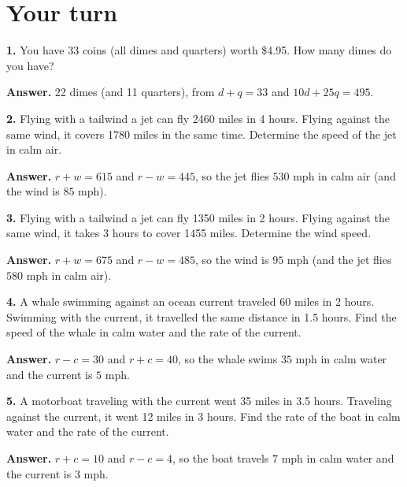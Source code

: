 \documentclass{ximera}
\begin{document}
\section*{Your turn}

\begin{problem}

\textbf{1.} You have 33 coins (all dimes and quarters) worth \$4.95. How many dimes do
you have?

\begin{hint}
\textbf{Answer.} 22 dimes (and 11 quarters), from $d+q=33$ and $10d+25q=495$.
\end{hint}
\end{problem}

\begin{problem}

\textbf{2.} Flying with a tailwind a jet can fly 2460 miles in 4 hours. Flying against
the same wind, it covers 1780 miles in the same time. Determine the speed of the jet in
calm air.

\begin{hint}
\textbf{Answer.} $r+w=615$ and $r-w=445$, so the jet flies $530$ mph in calm air (and the
wind is $85$ mph).
\end{hint}
\end{problem}

\begin{problem}

\textbf{3.} Flying with a tailwind a jet can fly 1350 miles in 2 hours. Flying against
the same wind, it takes 3 hours to cover 1455 miles. Determine the wind speed.

\begin{hint}
\textbf{Answer.} $r+w=675$ and $r-w=485$, so the wind is $95$ mph (and the jet flies
$580$ mph in calm air).
\end{hint}
\end{problem}

\begin{problem}

\textbf{4.} A whale swimming against an ocean current traveled 60 miles in 2 hours.
Swimming with the current, it travelled the same distance in 1.5 hours. Find the speed of
the whale in calm water and the rate of the current.

\begin{hint}
\textbf{Answer.} $r-c=30$ and $r+c=40$, so the whale swims $35$ mph in calm water and the
current is $5$ mph.
\end{hint}
\end{problem}

\begin{problem}

\textbf{5.} A motorboat traveling with the current went 35 miles in 3.5 hours. Traveling
against the current, it went 12 miles in 3 hours. Find the rate of the boat in calm water
and the rate of the current.

\begin{hint}
\textbf{Answer.} $r+c=10$ and $r-c=4$, so the boat travels $7$ mph in calm water and the
current is $3$ mph.
\end{hint}
\end{problem}
\end{document}

